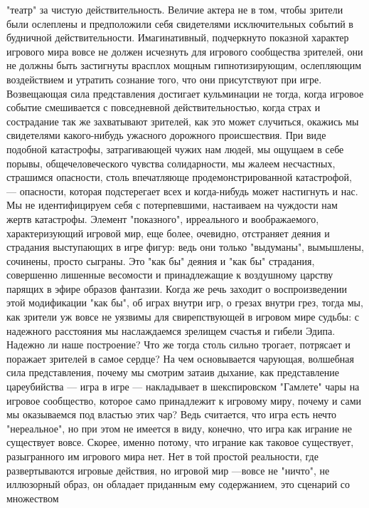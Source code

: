 \documentclass[12pt]{article}
\begin{document}
"театр" за чистую действительность. Величие актера не в том, чтобы зрители были ослеплены и предположили
себя  свидетелями  исключительных  событий  в  будничной  действительности.  Имагинативный,  подчеркнуто
показной характер игрового мира вовсе не должен исчезнуть для игрового сообщества зрителей, они не должны
быть застигнуты врасплох мощным гипнотизирующим, ослепляющим воздействием и утратить сознание того, 
что они присутствуют при игре. Возвещающая сила представления достигает кульминации не тогда, когда
игровое  событие  смешивается  с  повседневной  действительностью,  когда  страх  и  сострадание  так  же
захватывают зрителей, как это может случиться, окажись мы свидетелями какого-нибудь ужасного дорожного
происшествия. При виде подобной катастрофы, затрагивающей чужих нам людей, мы ощущаем в себе порывы,
общечеловеческого чувства солидарности, мы жалеем несчастных, страшимся опасности, столь впечатляюще
продемонстрированной катастрофой, --- опасности, которая подстерегает всех и когда-нибудь может настигнуть
и нас. Мы не идентифицируем себя с потерпевшими, настаиваем на чуждости нам жертв катастрофы. Элемент
"показного", ирреального и воображаемого, характеризующий игровой мир, еще более, очевидно, отстраняет
деяния и страдания выступающих в игре фигур: ведь они только "выдуманы", вымышлены, сочинены, просто
сыграны. Это "как бы" деяния и "как бы" страдания, совершенно лишенные весомости и принадлежащие к
воздушному  царству  парящих  в  эфире  образов  фантазии.  Когда  же  речь  заходит  о  воспроизведении  этой
модификации "как бы", об играх внутри игр, о грезах внутри грез, тогда мы, как зрители уж вовсе не уязвимы
для свирепствующей в игровом мире судьбы: с надежного расстояния мы наслаждаемся зрелищем счастья и
гибели Эдипа. Надежно ли наше построение? Что же тогда столь сильно трогает, потрясает и поражает зрителей
в самое сердце? На чем основывается чарующая, волшебная сила представления, почему мы смотрим затаив
дыхание, как представление цареубийства --- игра в игре --- накладывает в шекспировском "Гамлете" чары на
игровое сообщество, которое само принадлежит к игровому миру, почему и сами мы оказываемся под властью
этих чар? Ведь считается, что игра есть нечто "нереальное", но при этом не имеется в виду, конечно, что игра
как играние не существует вовсе. Скорее, именно потому, что играние как таковое существует, разыгранного им
игрового мира нет. Нет в той простой реальности, где развертываются игровые действия, но игровой мир ---вовсе не "ничто", не иллюзорный образ, он обладает приданным ему содержанием, это сценарий со множеством
\end{document}
